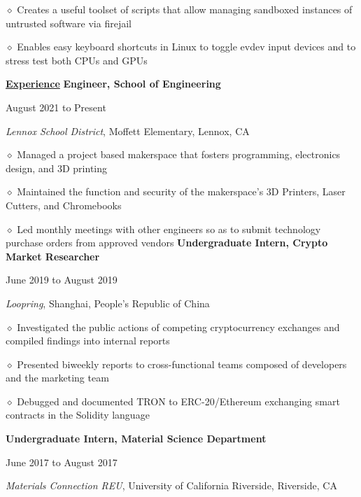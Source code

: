 \documentclass [11pt]{article}
\begin{document}
\begin{flushleft}
‭‭\quad\quad\quad$\diamond$ Creates a useful toolset of scripts that allow managing sandboxed instances of untrusted software via firejail

‭‭\quad\quad\quad$\diamond$ Enables easy keyboard shortcuts in Linux to toggle evdev input devices and to stress test both CPUs and GPUs

\vspace{7}
\underline{\textbf{Experience}}
\linebreak
\textbf{Engineer, School of Engineering}\begin{minipage}{0.7 \linewidth}\begin{flushright}August 2021 to Present\end{flushright}\end{minipage}
\emph{Lennox School District}, Moffett Elementary, Lennox, CA

‭‭\quad\quad\quad$\diamond$ Managed a project based makerspace that fosters programming, electronics design, and 3D printing

\quad\quad\quad$\diamond$ Maintained the function and security of the makerspace's 3D Printers, Laser Cutters, and Chromebooks

‭‭\quad\quad\quad$\diamond$ Led monthly meetings with other engineers so as to submit technology purchase orders from approved vendors
\linebreak
\textbf{Undergraduate Intern, Crypto Market Researcher}\begin{minipage}{0.55 \linewidth}\begin{flushright}June 2019 to August 2019\end{flushright}\end{minipage}
\emph{Loopring}, Shanghai, People's Republic of China

‭‭\quad\quad\quad$\diamond$ Investigated the public actions of competing cryptocurrency exchanges and compiled findings into internal reports

\quad\quad\quad$\diamond$ Presented biweekly reports to cross-functional teams composed of developers and the marketing team

‭‭\quad\quad\quad$\diamond$ Debugged and documented TRON to ERC-20/Ethereum exchanging smart contracts in the Solidity language


\linebreak
\textbf{Undergraduate Intern, Material Science Department}\begin{minipage}{0.535 \linewidth}\begin{flushright}June 2017 to August 2017\end{flushright}\end{minipage}
\emph{Materials Connection REU}, University of California Riverside, Riverside, CA


\end{flushleft}
\end{document}
